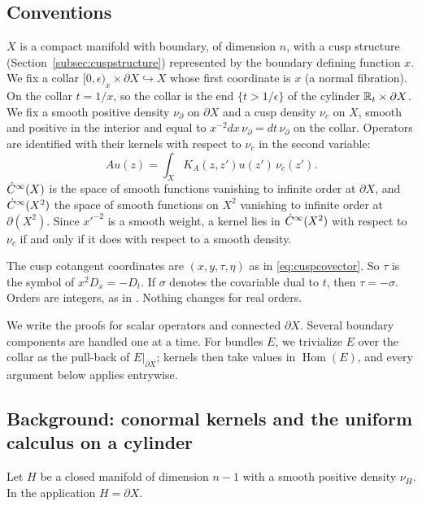 \subsection{Conventions}\label{cc:subsec:conventions}
\(X\) is a compact manifold with boundary, of dimension \(n\), with a cusp
structure (Section~\ref{subsec:cuspstructure}) represented by the
boundary defining function \(x\). We fix a collar
\([0,\epsilon)_x\times\partial X\hookrightarrow X\) whose first coordinate
is \(x\) (a normal fibration). On the collar \(t=1/x\), so the collar is
the end \(\{t>1/\epsilon\}\) of the cylinder \(\mathbb R_t\times\partial X\). We
fix a smooth positive density \(\nu_\partial\) on \(\partial X\) and a cusp
density \(\nu_c\) on \(X\), smooth and positive in the interior and equal
to \(x^{-2}dx\,\nu_\partial=dt\,\nu_\partial\) on the collar. Operators are
identified with their kernels with respect to \(\nu_c\) in the second
variable:
\[
 Au(z)=\int_XK_A(z,z')u(z')\,\nu_c(z').
\]
\(\dot C^\infty(X)\) is the space of smooth functions vanishing to infinite order at
\(\partial X\), and \(\dot C^\infty(X^2)\) the space of smooth functions on \(X^2\)
vanishing to infinite order at \(\partial(X^2)\). Since \(x'^{-2}\) is a
smooth weight, a kernel lies in \(\dot C^\infty(X^2)\) with respect to \(\nu_c\) if
and only if it does with respect to a smooth density.

The cusp cotangent coordinates are \((x,y,\tau,\eta)\) as in
\eqref{eq:cuspcovector}. So \(\tau\) is the symbol of \(x^2D_x=-D_t\). If
\(\sigma\) denotes the covariable dual to \(t\), then \(\tau=-\sigma\).
Orders are integers, as in \cite{MN}. Nothing changes for real orders.

We write the proofs for scalar operators and connected \(\partial X\).
Several boundary components are handled one at a time. For bundles \(E\),
we trivialize \(E\) over the collar as the pull-back of
\(E|_{\partial X}\); kernels then take values in
\(\operatorname{Hom}(E)\), and every argument below applies entrywise.

\subsection{Background: conormal kernels and the uniform calculus on a
cylinder}\label{cc:subsec:background}
Let \(H\) be a closed manifold of dimension \(n-1\) with a smooth positive
density \(\nu_H\). In the application \(H=\partial X\).

